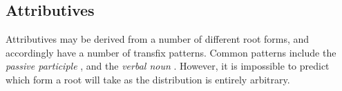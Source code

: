 \documentclass[grammar]{subfiles}
\begin{document}

%

  \subsection{Attributives}
  \label{ssec:am_attributives}

  Attributives may be derived from a number of different root forms, and
  accordingly have a number of transfix patterns.  Common patterns include the
  \emph{passive participle} , and the
  \emph{verbal noun} .  However, it is
  impossible to predict which form a root will take as the distribution is
  entirely arbitrary.

%
%
\end{document}
